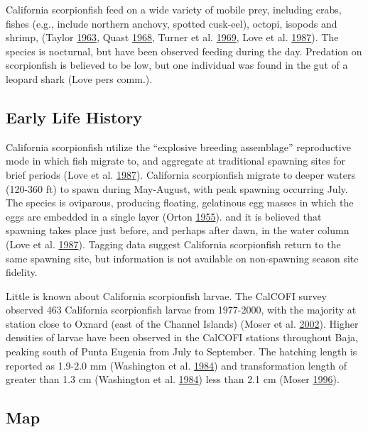 \documentclass[12pt,]{article}
\begin{document}
California scorpionfish feed on a wide variety of mobile prey, including
crabs, fishes (e.g., include northern anchovy, spotted cusk-eel),
octopi, isopods and shrimp, (Taylor
\protect\hyperlink{ref-Taylor1963}{1963}, Quast
\protect\hyperlink{ref-Quast1968}{1968}, Turner et al.
\protect\hyperlink{ref-Turner1969}{1969}, Love et al.
\protect\hyperlink{ref-Love1987}{1987}). The species is nocturnal, but
have been observed feeding during the day. Predation on scorpionfish is
believed to be low, but one individual was found in the gut of a leopard
shark (Love pers comm.).

\subsection{Early Life History}\label{early-life-history}

California scorpionfish utilize the ``explosive breeding assemblage''
reproductive mode in which fish migrate to, and aggregate at traditional
spawning sites for brief periods (Love et al.
\protect\hyperlink{ref-Love1987}{1987}). California scorpionfish migrate
to deeper waters (120-360 ft) to spawn during May-August, with peak
spawning occurring July. The species is oviparous, producing floating,
gelatinous egg masses in which the eggs are embedded in a single layer
(Orton \protect\hyperlink{ref-Orton1955}{1955}). and it is believed that
spawning takes place just before, and perhaps after dawn, in the water
column (Love et al. \protect\hyperlink{ref-Love1987}{1987}). Tagging
data suggest California scorpionfish return to the same spawning site,
but information is not available on non-spawning season site fidelity.

Little is known about California scorpionfish larvae. The CalCOFI survey
observed 463 California scorpionfish larvae from 1977-2000, with the
majority at station close to Oxnard (east of the Channel Islands) (Moser
et al. \protect\hyperlink{ref-Moser2002}{2002}). Higher densities of
larvae have been observed in the CalCOFI stations throughout Baja,
peaking south of Punta Eugenia from July to September. The hatching
length is reported as 1.9-2.0 mm (Washington et al.
\protect\hyperlink{ref-Washington1984}{1984}) and transformation length
of greater than 1.3 cm (Washington et al.
\protect\hyperlink{ref-Washington1984}{1984}) less than 2.1 cm (Moser
\protect\hyperlink{ref-Moser1996}{1996}).

\subsection{Map}\label{map}
\end{document}
